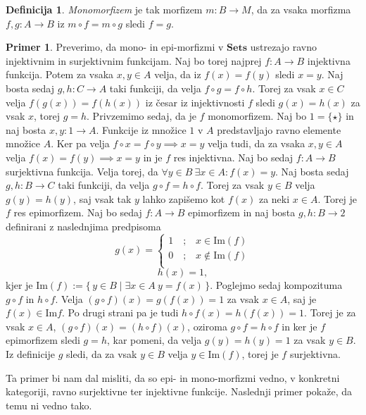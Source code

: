 \documentclass[12pt,a4paper]{book}
\theoremstyle{definition}
\newtheorem{definicija}{Definicija}[chapter]
\theoremstyle{plain}
\theoremstyle{definition}
\newtheorem{primer}{Primer}[section]
\theoremstyle{remark}
\newcommand{\cat}[1]{\textbf{#1}}
\renewcommand{\set}[1]{\{\,#1\,\}}
\begin{document}
\begin{definicija}
\emph{Monomorfizem} je tak morfizem $m : B \to M$, da za vsaka morfizma $f,g : A \to B$ iz $m \circ f = m \circ g$ sledi $f = g$.
\end{definicija}

\begin{primer}
Preverimo, da mono- in epi-morfizmi v $\cat{Sets}$ ustrezajo ravno injektivnim in surjektivnim funkcijam. Naj bo torej najprej $f : A \to B$ injektivna funkcija. Potem za vsaka $x,y \in A$ velja, da iz $f(x) = f(y)$ sledi $x = y$. Naj bosta sedaj $g,h : C \to A$ taki funkciji, da velja $f \circ g = f \circ h$. Torej za vsak $x \in C$ velja $f(g(x)) = f(h(x))$ iz česar iz injektivnosti $f$ sledi $g(x) = h(x)$ za vsak $x$, torej $g = h$. 
Privzemimo sedaj, da je $f$ monomorfizem. Naj bo $1 = \{\star\}$ in naj bosta $x,y : 1 \to A$. Funkcije iz množice $1$ v $A$ predstavljajo ravno elemente množice $A$. Ker pa velja $f \circ x = f \circ y \implies x = y$ velja tudi, da za vsaka $x,y \in A$ velja $f(x) = f(y) \implies x = y$ in je $f$ res injektivna. Naj bo sedaj $f : A \rightarrow B$ surjektivna funkcija. Velja torej, da $\forall y \in B \ \exists x \in A : f(x) = y$. Naj bosta sedaj $g,h : B \to C$ taki funkciji, da velja $g \circ f = h \circ f$. Torej za vsak $y \in B$ velja $g(y) = h(y)$, saj vsak tak $y$ lahko zapišemo kot $f(x)$ za neki $x \in A$. Torej je $f$ res epimorfizem. Naj bo sedaj $f : A \to B$ epimorfizem in naj bosta $g,h : B \to 2$ definirani z naslednjima predpisoma
\[
g(x)=
\begin{cases}
1 \quad\text{;}\quad x \in \mathrm{Im}(f) \\
0 \quad\text{;}\quad x \notin \mathrm{Im}(f) \\
\end{cases}
\]
$$ h(x) = 1,$$
kjer je $\mathrm{Im}(f) := \set{y \in B \mid \exists x \in A \ y = f(x)}$.
Poglejmo sedaj kompozituma $g \circ f$ in $h \circ f$. Velja $(g \circ f)(x) = g(f(x)) = 1$ za vsak $x \in A$, saj je $f(x) \in \mathrm{Im}f$. Po drugi strani pa je tudi $h \circ f(x) = h(f(x)) = 1$. Torej je za vsak $x \in A$, $(g \circ f)(x) = (h \circ f)(x)$, oziroma $g\circ f = h\circ f$ in ker je $f$ epimorfizem sledi $g = h$, kar pomeni, da velja $g(y) = h(y) = 1$ za vsak $y \in B$. Iz definicije $g$ sledi, da za vsak $y \in B$ velja $y \in \mathrm{Im}(f)$, torej je $f$ surjektivna.
\end{primer}

Ta primer bi nam dal misliti, da so epi- in mono-morfizmi vedno, v konkretni kategoriji, ravno surjektivne ter injektivne funkcije. Naslednji primer pokaže, da temu ni vedno tako.
\end{document}
